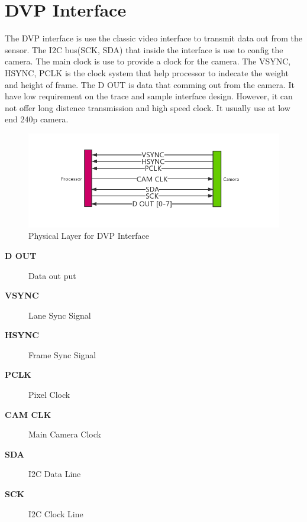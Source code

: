 \documentclass[12pt,article]{memoir}
\begin{document}
\section{DVP Interface} 
The DVP interface is use the classic video interface to transmit data out from the sensor. The I2C bus(SCK, SDA) that inside the interface is use to config the camera. The main clock is use to provide a clock for the camera. The VSYNC, HSYNC, PCLK is the clock system that help processor to indecate the weight and height of frame. The D OUT is data that comming out from the camera. It have low requirement on the trace and sample interface design. However, it can not offer long distence transmission and high speed clock. It usually use at low end 240p camera.
\begin{figure}[htp]
\includegraphics[width=\textwidth]{DR00002_DVP.png}
 \caption{Physical Layer for DVP Interface}	
\end{figure}
\begin{description}
	\item[\textbf{D OUT}]Data out put
	\item[\textbf{VSYNC}]Lane Sync Signal
	\item[\textbf{HSYNC}]Frame Sync Signal
	\item[\textbf{PCLK}]Pixel Clock
	\item[\textbf{CAM CLK}]Main Camera Clock
	\item[\textbf{SDA}]I2C Data Line
	\item[\textbf{SCK}]I2C Clock Line
\end{description}
\newpage
\end{document}

